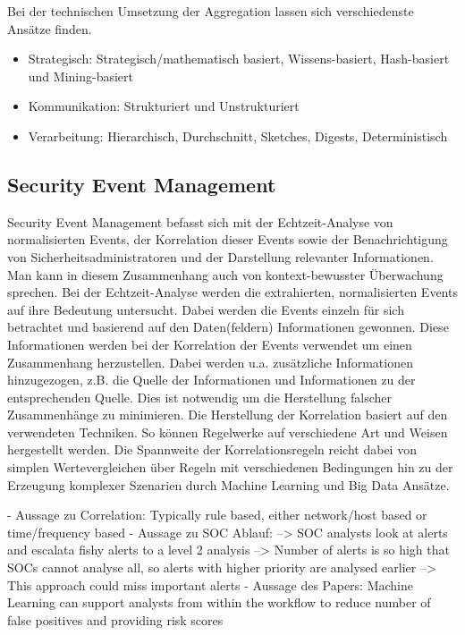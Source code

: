 Bei der technischen Umsetzung der Aggregation lassen sich verschiedenste Ansätze finden. 
\begin{itemize}
\item Strategisch: Strategisch/mathematisch basiert, Wissens-basiert, Hash-basiert und Mining-basiert
\item Kommunikation: Strukturiert und Unstrukturiert
\item Verarbeitung: Hierarchisch, Durchschnitt, Sketches, Digests, Deterministisch
\end{itemize} 

\subsection{Security Event Management}
\label{cha:Security Event Management}

Security Event Management befasst sich mit der Echtzeit-Analyse von normalisierten Events, der Korrelation dieser Events sowie der Benachrichtigung von Sicherheitsadministratoren und der Darstellung relevanter Informationen. Man kann in diesem Zusammenhang auch von kontext-bewusster Überwachung sprechen.
Bei der Echtzeit-Analyse werden die extrahierten, normalisierten Events auf ihre Bedeutung untersucht. Dabei werden die Events einzeln für sich betrachtet und basierend auf den Daten(feldern) Informationen gewonnen. Diese Informationen werden bei der Korrelation der Events verwendet um einen Zusammenhang herzustellen. Dabei werden u.a. zusätzliche Informationen hinzugezogen, z.B. die Quelle der Informationen und Informationen zu der entsprechenden Quelle.
Dies ist notwendig um die Herstellung falscher Zusammenhänge zu minimieren. Die Herstellung der Korrelation basiert auf den verwendeten Techniken. So können Regelwerke auf verschiedene Art und Weisen hergestellt werden. Die Spannweite der Korrelationsregeln reicht dabei von simplen Wertevergleichen über Regeln mit verschiedenen Bedingungen hin zu der Erzeugung komplexer Szenarien durch Machine Learning und Big Data Ansätze.

- Aussage zu Correlation: Typically rule based, either network/host based or time/frequency based
- Aussage zu SOC Ablauf: 
	--> SOC analysts look at alerts and escalata fishy alerts to a level 2 analysis
	--> Number of alerts is so high that SOCs cannot analyse all, so alerts with higher priority are analysed earlier
		--> This approach could miss important alerts
- Aussage des Papers: Machine Learning can support analysts from within the workflow to reduce number of false positives and providing risk scores


